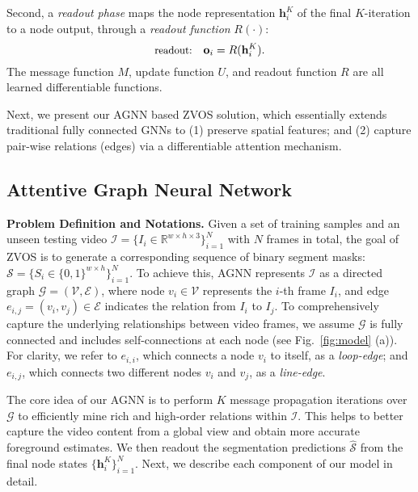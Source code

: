 \documentclass[10pt,twocolumn,letterpaper]{article}
\begin{document}
Second, a \textit{readout phase} maps the node representation $\mathbf{h}_i^K$ of the final $K$-iteration to a node output, through a \textit{readout function} $R(\cdot)$:
	\vspace*{-4pt}	
\begin{equation}
    \text{\small readout:}~~~\mathbf{o}_i = R(\mathbf{h}_i^K).
	\label{intro2}
	\vspace*{-4pt}	
\end{equation}
The message function $M$, update function $U$, and readout function $R$ are all learned differentiable functions.

Next, we present our AGNN based ZVOS solution, which essentially extends traditional fully connected GNNs to (1) preserve spatial features; and (2) capture pair-wise relations (edges) via a differentiable attention mechanism.
\vspace*{-2pt}	
\subsection{Attentive Graph Neural Network}\label{sec:agnn}
	\vspace*{-1pt}	
\noindent\textbf{Problem Definition and Notations.} Given a set of training samples and an unseen testing video $\mathcal{I} \!=\! \{{I}_i\!\in\!\mathbb{R}^{w\times h \times 3}\}_{i=1}^{N}$ with $N$ frames in total, the goal of ZVOS is to generate a corresponding sequence of binary segment masks: $\mathcal{S} \!=\! \{{S}_i\!\in\!\{0,1\}^{w\times h}\}_{i=1}^{N}$.
To achieve this, AGNN represents $\mathcal{I}$ as a directed graph $\mathcal{G}\!=\!(\mathcal{V},\mathcal{E})$, where node $v_i\!\in\!\mathcal{V}$ represents the $i$-th frame ${I}_i$, and edge $e_{i,j}\!=\!(v_i,v_j)\!\in\!\mathcal{E}$ indicates the relation from ${I}_i$ to ${I}_j$. To comprehensively capture the underlying relationships between video frames, we assume $\mathcal{G}$ is fully connected and includes self-connections at each node (see Fig.~\ref{fig:model} (a)). For clarity, we refer to $e_{i,i}$, which connects a node $v_i$ to itself, as a \textit{loop-edge}; and $e_{i,j}$, which connects two different nodes $v_i$ and $v_j$, as a \textit{line-edge}.

The core idea of our AGNN  is to perform $K$ message propagation iterations over $\mathcal{G}$ to efficiently mine rich and high-order relations within $\mathcal{I}$. This helps to better capture the video content from a global view and obtain more accurate foreground estimates. We then readout the segmentation predictions $\hat{\mathcal{S}}$ from the final node states $\{\mathbf{h}^K_i\}_{i=1}^{N}$. Next, we describe each component of our model in detail.
\end{document}

